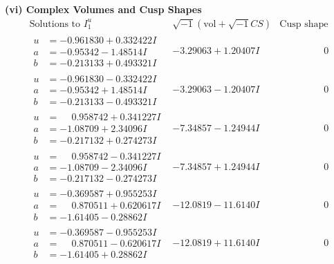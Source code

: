 \documentclass[1p]{elsarticle_modified}
\theoremstyle{definition}
\newcommand{\I}{\sqrt{-1}}
\begin{document}
\newpage\flushleft \textbf{(vi) Complex Volumes and Cusp Shapes}
$$\begin{array}{c|c|c}  
\text{Solutions to }I^u_{1}& \I (\text{vol} + \sqrt{-1}CS) & \text{Cusp shape}\\
 \hline 
\begin{aligned}
u &= -0.961830 + 0.332422 I \\
a &= -0.95342 - 1.48514 I \\
b &= -0.213133 + 0.493321 I\end{aligned}
 & -3.29063 + 1.20407 I & \phantom{-0.000000 } 0 \\ \hline\begin{aligned}
u &= -0.961830 - 0.332422 I \\
a &= -0.95342 + 1.48514 I \\
b &= -0.213133 - 0.493321 I\end{aligned}
 & -3.29063 - 1.20407 I & \phantom{-0.000000 } 0 \\ \hline\begin{aligned}
u &= \phantom{-}0.958742 + 0.341227 I \\
a &= -1.08709 + 2.34096 I \\
b &= -0.217132 + 0.274273 I\end{aligned}
 & -7.34857 - 1.24944 I & \phantom{-0.000000 } 0 \\ \hline\begin{aligned}
u &= \phantom{-}0.958742 - 0.341227 I \\
a &= -1.08709 - 2.34096 I \\
b &= -0.217132 - 0.274273 I\end{aligned}
 & -7.34857 + 1.24944 I & \phantom{-0.000000 } 0 \\ \hline\begin{aligned}
u &= -0.369587 + 0.955253 I \\
a &= \phantom{-}0.870511 + 0.620617 I \\
b &= -1.61405 - 0.28862 I\end{aligned}
 & -12.0819 - 11.6140 I & \phantom{-0.000000 } 0 \\ \hline\begin{aligned}
u &= -0.369587 - 0.955253 I \\
a &= \phantom{-}0.870511 - 0.620617 I \\
b &= -1.61405 + 0.28862 I\end{aligned}
 & -12.0819 + 11.6140 I & \phantom{-0.000000 } 0 \\ \hline\begin{aligned}

\end{aligned}
\end{array}$$
\end{document}

